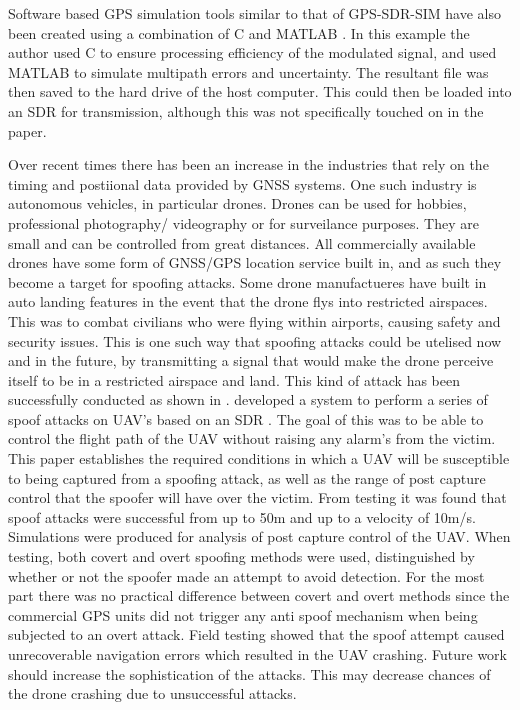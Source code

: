 Software based GPS simulation tools similar to that of GPS-SDR-SIM have also been created using a combination of C and MATLAB \cite{RN15}. In this example the author used
C to ensure processing efficiency of the modulated signal, and used MATLAB to simulate multipath errors and uncertainty. The resultant file was then saved to the hard
drive of the host computer. This could then be loaded into an SDR for transmission, although this was not specifically touched on in the paper.

Over recent times there has been an increase in the industries that rely on the timing and postiional data provided by GNSS systems. One such industry is autonomous
vehicles, in particular drones. Drones can be used for hobbies, professional photography/ videography or for surveilance purposes. They are small and can be controlled from great
distances. All commercially available drones have some form of GNSS/GPS location service built in, and as such they become a target for spoofing attacks. Some drone
manufactueres have built in auto landing features in the event that the drone flys into restricted airspaces. This was to combat civilians who were flying within
airports, causing safety and security issues. This is one such way that spoofing attacks could be utelised now and in the future, by transmitting a signal that would make
the drone perceive itself to be in a restricted airspace and land. This kind of attack has been successfully conducted as shown in \cite{RN4}. 
\textcite{RN21} developed a system to perform a series of spoof attacks on UAV's based on an SDR \cite{RN23}. The goal of this was to be able to 
control the flight path of the UAV without raising any alarm's from the victim. This paper establishes the required conditions in which a UAV will
be susceptible to being captured from a spoofing attack, as well as the range of post capture control that the spoofer will have over the victim.
From testing it was found that spoof attacks were successful from up to 50m and up to a velocity of 10m/s.
Simulations were produced for analysis of post capture control of the UAV. 
When testing, both covert and overt spoofing methods were used, distinguished by whether or not the spoofer made an attempt to avoid detection. For the most part there
was no practical difference between covert and overt methods since the commercial GPS units did not trigger any anti spoof mechanism when being subjected to an overt
attack. Field testing showed that the spoof attempt caused unrecoverable navigation errors which resulted in the UAV crashing. Future work should increase the
sophistication of the attacks. This may decrease chances of the drone crashing due to unsuccessful attacks.

